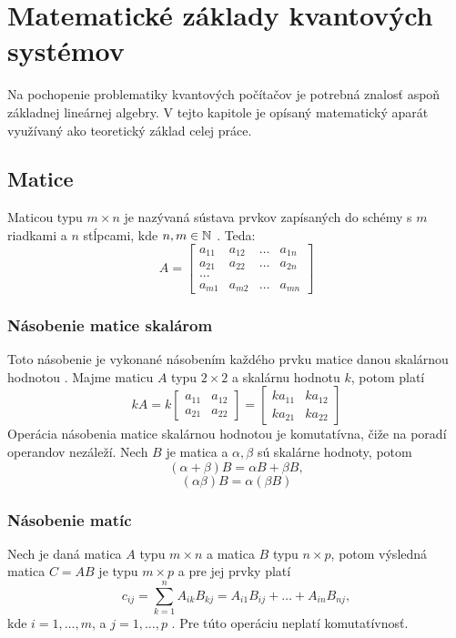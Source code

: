 
\chapter{Matematické základy kvantových systémov}

Na pochopenie problematiky kvantových počítačov je potrebná znalosť aspoň základnej lineárnej algebry.
V tejto kapitole je opísaný matematický aparát využívaný ako teoretický základ celej práce.

\section{Matice}

Maticou typu \(m \times n\) je nazývaná sústava prvkov zapísaných do schémy s \(m\) riadkami a \(n\) stĺpcami, kde \(n,m \in \mathbb{N}\) \cite{Ste18}.
Teda:
\[
A = \begin{bmatrix}
		a_{11} & a_{12} & \dots & a_{1n} \\
		a_{21} & a_{22} & \dots & a_{2n} \\
		{...}							\\
		a_{m1} & a_{m2} & \dots & a_{mn}
     \end{bmatrix}
\]

\subsection{Násobenie matice skalárom}
Toto násobenie je vykonané násobením každého prvku matice danou skalárnou hodnotou \cite{Ste18}.
Majme maticu \(A\) typu \(2 \times 2\) a skalárnu hodnotu \(k\), potom platí
\[
kA = k \begin{bmatrix}
		 a_{11} & a_{12} \\
		 a_{21} & a_{22}
       \end{bmatrix}
= \begin{bmatrix}
	ka_{11} & ka_{12} \\
	ka_{21} & ka_{22}
  \end{bmatrix}
\]
Operácia násobenia matice skalárnou hodnotou je komutatívna, čiže na poradí operandov nezáleží.
Nech \(B\) je matica a \(\alpha, \beta\) sú skalárne hodnoty, potom
\[(\alpha + \beta)B = \alpha B + \beta B,\] \[(\alpha \beta)B = \alpha(\beta B)\]

\subsection{Násobenie matíc}
Nech je daná matica \(A\) typu \(m \times n\) a matica \(B\) typu \(n \times p\), potom výsledná matica \(C = AB\) je typu \(m \times p\) a pre jej prvky platí
\[c_{ij} = \sum_{k=1}^{n} A_{ik}B_{kj} = A_{i1}B_{ij} + \dots + A_{in}B_{nj},\]
kde \(i = 1, \dots ,m\), a \(j = 1, \dots , p\) \cite{Ste18}.
Pre túto operáciu neplatí komutatívnosť.

